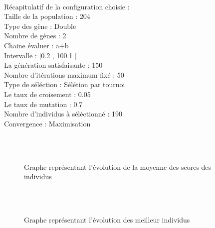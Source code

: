 \documentclass[a4paper,10pt]{article}
\begin{document}
\\Récapitulatif de la configuration choisie : 
\\Taille de la population :  204
\\Type des gène :  Double\\Nombre de gènes :  2
\\Chaine évaluer :  a+b
\\Intervalle :  [0.2 , 100.1 ]
\\La génération satisfaisante :  150
\\Nombre d'itérations maximum fixé :  50
\\Type de séléction :  Sélétion par tournoi\\Le taux de croisement :  0.05
\\Le taux de mutation :  0.7
\\Nombre d'individus à séléctionné :  190
\\Convergence : Maximisation
\\\begin{figure}[h]
\\\\
\caption{Graphe représentant l'évolution de la moyenne des scores des individus}
\end{figure}
\begin{figure}[h]
\\\\
\caption{Graphe représentant l'évolution des meilleur individus}
\end{figure}
\end{document}
